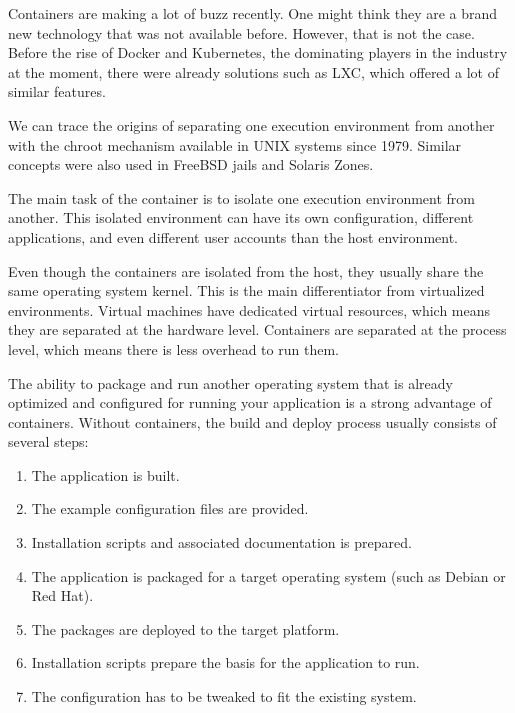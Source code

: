 

Containers are making a lot of buzz recently. One might think they are a brand new technology that was not available before. However, that is not the case. Before the rise of Docker and Kubernetes, the dominating players in the industry at the moment, there were already solutions such as LXC, which offered a lot of similar features.

We can trace the origins of separating one execution environment from another with the chroot mechanism available in UNIX systems since 1979. Similar concepts were also used in FreeBSD jails and Solaris Zones.

The main task of the container is to isolate one execution environment from another. This isolated environment can have its own configuration, different applications, and even different user accounts than the host environment.

Even though the containers are isolated from the host, they usually share the same operating system kernel. This is the main differentiator from virtualized environments. Virtual machines have dedicated virtual resources, which means they are separated at the hardware level. Containers are separated at the process level, which means there is less overhead to run them.

The ability to package and run another operating system that is already optimized and configured for running your application is a strong advantage of containers. Without containers, the build and deploy process usually consists of several steps:

\begin{enumerate}
\item 
The application is built.

\item 
The example configuration files are provided.

\item 
Installation scripts and associated documentation is prepared.

\item 
The application is packaged for a target operating system (such as Debian or Red Hat).

\item 
The packages are deployed to the target platform.

\item 
Installation scripts prepare the basis for the application to run.

\item 
The configuration has to be tweaked to fit the existing system.
\end{enumerate}

